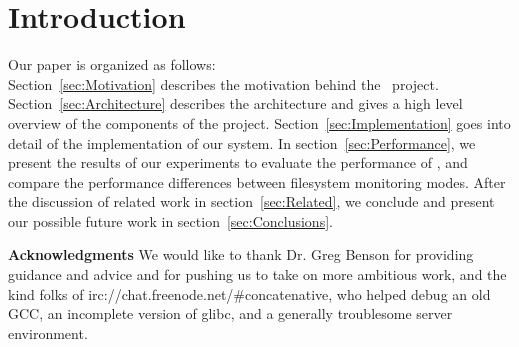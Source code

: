 \section{Introduction}
\label{sec:Introduction}


Our paper is organized as follows:\\
Section~\ref{sec:Motivation} describes the motivation behind the \teledroid\ project.
Section~\ref{sec:Architecture} describes the architecture and gives a high level overview of the components of the project.
Section~\ref{sec:Implementation} goes into detail of the implementation of our system.
In section~\ref{sec:Performance}, we present the results of our experiments to evaluate the performance of \teledroid, and compare the performance differences between filesystem monitoring modes.
After the discussion of related work in section~\ref{sec:Related}, we conclude and present our possible future work 
in section~\ref{sec:Conclusions}.

{\bf Acknowledgments}  We would like to thank Dr. Greg Benson for providing guidance and advice and for pushing us to take on more ambitious work, and the kind folks of irc://chat.freenode.net/#concatenative, who helped debug an old GCC, an incomplete version of glibc, and a generally troublesome server environment.